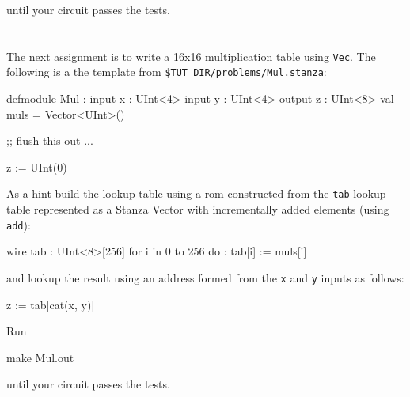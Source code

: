 \noindent 
until your circuit passes the tests.

\section{}

The next assignment is to write a 16x16 multiplication table using \verb+Vec+.
The following is a the template from \verb+$TUT_DIR/problems/Mul.stanza+:

\begin{stanza}
defmodule Mul :
  input x   : UInt<4>
  input y   : UInt<4>
  output z  : UInt<8>
  val muls = Vector<UInt>()

  ;; flush this out ...

  z := UInt(0)
\end{stanza}

\noindent
As a hint build the lookup table using a rom constructed from the \verb+tab+ lookup table represented as a Stanza Vector with incrementally added elements (using \verb!add!):

\begin{stanza}
wire tab : UInt<8>[256]
for i in 0 to 256 do :
  tab[i] := muls[i]
\end{stanza}

\noindent
and lookup the result using an address formed from the \verb+x+ and \verb+y+ inputs as follows:

\begin{stanza}
z := tab[cat(x, y)]
\end{stanza}

\noindent
Run 

\begin{bash}
make Mul.out
\end{bash}

\noindent 
until your circuit passes the tests.

